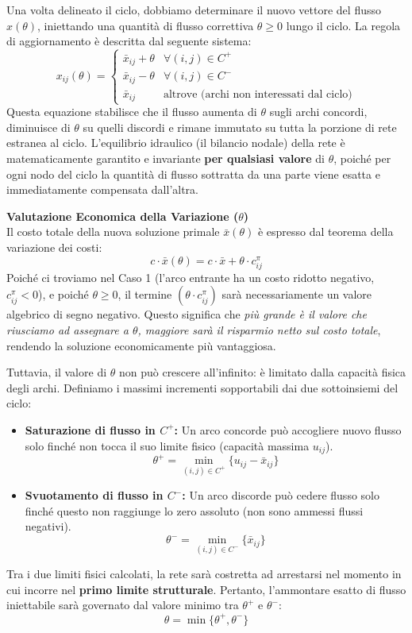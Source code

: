 \documentclass[12pt, a4paper]{article}
\begin{document}
	Una volta delineato il ciclo, dobbiamo determinare il nuovo vettore del flusso ${x}(\theta)$, iniettando una quantità di flusso correttiva $\theta \ge 0$ lungo il ciclo. La regola di aggiornamento è descritta dal seguente sistema:
	\[
	{x}_{ij}(\theta) = 
	\begin{cases}
		\bar{x}_{ij} + \theta & \forall (i, j) \in C^+ \\
		\bar{x}_{ij} - \theta & \forall (i, j) \in C^- \\
		\bar{x}_{ij} & \text{altrove (archi non interessati dal ciclo)}
	\end{cases}
	\]
	Questa equazione stabilisce che il flusso aumenta di $\theta$ sugli archi concordi, diminuisce di $\theta$ su quelli discordi e rimane immutato su tutta la porzione di rete estranea al ciclo. L'equilibrio idraulico (il bilancio nodale) della rete è matematicamente garantito e invariante \textbf{per qualsiasi valore} di $\theta$, poiché per ogni nodo del ciclo la quantità di flusso sottratta da una parte viene esatta e immediatamente compensata dall'altra.
	
	\textbf{Valutazione Economica della Variazione ($\theta$)}\\
	Il costo totale della nuova soluzione primale $\bar{x}(\theta)$ è espresso dal teorema della variazione dei costi:
	\[
	c \cdot \bar{x}(\theta) = c \cdot \bar{x} + \theta \cdot c^\pi_{ij}
	\]
	Poiché ci troviamo nel Caso 1 (l'arco entrante ha un costo ridotto negativo, $c^\pi_{ij} < 0$), e poiché $\theta \ge 0$, il termine $(\theta \cdot c^\pi_{ij})$ sarà necessariamente un valore algebrico di segno negativo. Questo significa che \textit{più grande è il valore che riusciamo ad assegnare a $\theta$, maggiore sarà il risparmio netto sul costo totale}, rendendo la soluzione economicamente più vantaggiosa.
	
	Tuttavia, il valore di $\theta$ non può crescere all'infinito: è limitato dalla capacità fisica degli archi. Definiamo i massimi incrementi sopportabili dai due sottoinsiemi del ciclo:
	\begin{itemize}
		\item \textbf{Saturazione di flusso in $C^+$:} Un arco concorde può accogliere nuovo flusso solo finché non tocca il suo limite fisico (capacità massima $u_{ij}$).
		\[
		\theta^+ = \min_{(i,j) \in C^+} \{ u_{ij} - \bar{x}_{ij} \}
		\]
		\item \textbf{Svuotamento di flusso in $C^-$:} Un arco discorde può cedere flusso solo finché questo non raggiunge lo zero assoluto (non sono ammessi flussi negativi).
		\[
		\theta^- = \min_{(i,j) \in C^-} \{ \bar{x}_{ij} \}
		\]
	\end{itemize}
	Tra i due limiti fisici calcolati, la rete sarà costretta ad arrestarsi nel momento in cui incorre nel \textbf{primo limite strutturale}. Pertanto, l'ammontare esatto di flusso iniettabile sarà governato dal valore minimo tra $\theta^+$ e $\theta^-$:
	\[
	\theta = \min \{ \theta^+, \theta^- \}
	\]
	
\end{document}
